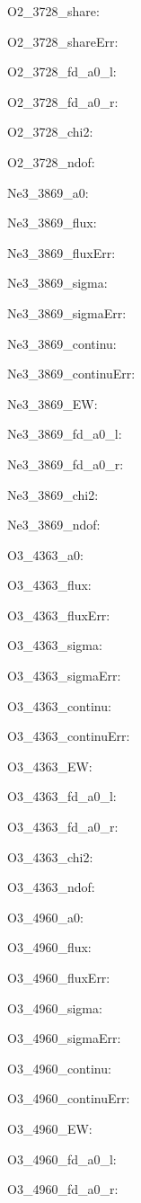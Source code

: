 \item O2\_3728\_share: 
\item O2\_3728\_shareErr: 
\item O2\_3728\_fd\_a0\_l: 
\item O2\_3728\_fd\_a0\_r: 
\item O2\_3728\_chi2: 
\item O2\_3728\_ndof: 
\item Ne3\_3869\_a0: 
\item Ne3\_3869\_flux: 
\item Ne3\_3869\_fluxErr: 
\item Ne3\_3869\_sigma: 
\item Ne3\_3869\_sigmaErr: 
\item Ne3\_3869\_continu: 
\item Ne3\_3869\_continuErr: 
\item Ne3\_3869\_EW: 
\item Ne3\_3869\_fd\_a0\_l: 
\item Ne3\_3869\_fd\_a0\_r: 
\item Ne3\_3869\_chi2: 
\item Ne3\_3869\_ndof: 
\item O3\_4363\_a0: 
\item O3\_4363\_flux: 
\item O3\_4363\_fluxErr: 
\item O3\_4363\_sigma: 
\item O3\_4363\_sigmaErr: 
\item O3\_4363\_continu: 
\item O3\_4363\_continuErr: 
\item O3\_4363\_EW: 
\item O3\_4363\_fd\_a0\_l: 
\item O3\_4363\_fd\_a0\_r: 
\item O3\_4363\_chi2: 
\item O3\_4363\_ndof: 
\item O3\_4960\_a0: 
\item O3\_4960\_flux: 
\item O3\_4960\_fluxErr: 
\item O3\_4960\_sigma: 
\item O3\_4960\_sigmaErr: 
\item O3\_4960\_continu: 
\item O3\_4960\_continuErr: 
\item O3\_4960\_EW: 
\item O3\_4960\_fd\_a0\_l: 
\item O3\_4960\_fd\_a0\_r: 
